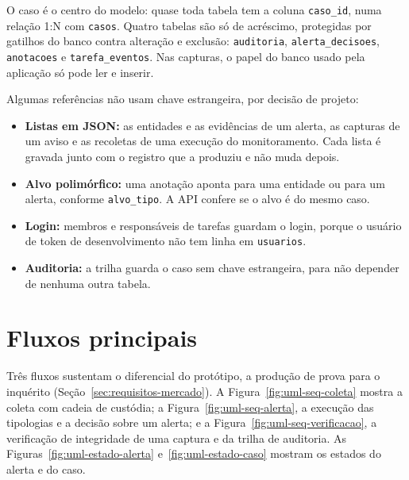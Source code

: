 O caso é o centro do modelo: quase toda tabela tem a coluna
\texttt{caso\_id}, numa relação 1:N com \texttt{casos}. Quatro tabelas são
só de acréscimo, protegidas por gatilhos do banco contra alteração e
exclusão: \texttt{auditoria}, \texttt{alerta\_decisoes}, \texttt{anotacoes} e
\texttt{tarefa\_eventos}. Nas capturas, o papel do banco usado pela aplicação
só pode ler e inserir.





Algumas referências não usam chave estrangeira, por decisão de projeto:
\begin{itemize}
	\item \textbf{Listas em JSON:} as entidades e as evidências de um alerta,
	as capturas de um aviso e as recoletas de uma execução do monitoramento.
	Cada lista é gravada junto com o registro que a produziu e não muda depois.
	\item \textbf{Alvo polimórfico:} uma anotação aponta para uma entidade ou
	para um alerta, conforme \texttt{alvo\_tipo}. A API confere se o alvo é do
	mesmo caso.
	\item \textbf{Login:} membros e responsáveis de tarefas guardam o login,
	porque o usuário de token de desenvolvimento não tem linha em
	\texttt{usuarios}.
	\item \textbf{Auditoria:} a trilha guarda o caso sem chave estrangeira,
	para não depender de nenhuma outra tabela.
\end{itemize}

\section{Fluxos principais}
\label{sec:desenv-fluxos}

Três fluxos sustentam o diferencial do protótipo, a produção de prova para o
inquérito (Seção~\ref{sec:requisitos-mercado}). A
Figura~\ref{fig:uml-seq-coleta} mostra a coleta com cadeia de custódia; a
Figura~\ref{fig:uml-seq-alerta}, a execução das tipologias e a decisão sobre um
alerta; e a Figura~\ref{fig:uml-seq-verificacao}, a verificação de integridade de
uma captura e da trilha de auditoria. As Figuras~\ref{fig:uml-estado-alerta}
e~\ref{fig:uml-estado-caso} mostram os estados do alerta e do caso.







